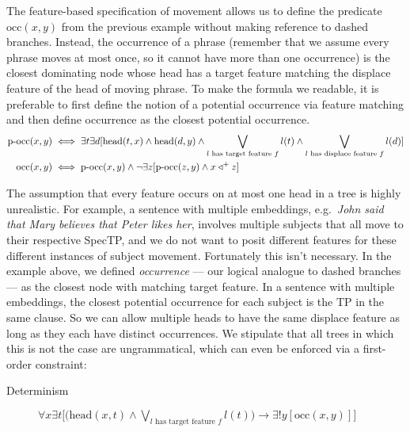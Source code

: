 \begin{examplebox}
    The feature-based specification of movement allows us to define the predicate $\text{occ}(x,y)$ from the previous example without making reference to dashed branches.
    Instead, the occurrence of a phrase (remember that we assume every phrase moves at most once, so it cannot have more than one occurrence) is the closest dominating node whose head has a target feature matching the displace feature of the head of moving phrase.
    To make the formula we readable, it is preferable to first define the notion of a potential occurrence via feature matching and then define occurrence as the closest potential occurrence.
    \begin{align*}
        \text{p-occ}(x,y) & \iff
            \exists t \exists d
                [
                \mathrm{head}(t,x)
                \wedge
                \mathrm{head}(d,y)
                \wedge
                \bigvee_{l \text{ has target feature } f}
                l(t)
                \wedge
                \bigvee_{l \text{ has displace feature } f}
                l(d)
                ]\\
        \text{occ}(x,y) & \iff
            \text{p-occ}(x,y)
            \wedge
            \neg \exists z [
                \text{p-occ}(z,y)
                \wedge
                x \triangleleft^+ z
                ]
    \end{align*}
\end{examplebox}

The assumption that every feature occurs on at most one head in a tree is highly unrealistic.
For example, a sentence with multiple embeddings, e.g.\ \emph{John said that Mary believes that Peter likes her}, involves multiple subjects that all move to their respective SpecTP, and we do not want to posit different features for these different instances of subject movement.
Fortunately this isn't necessary. 
In the example above, we defined \emph{occurrence} --- our logical analogue to dashed branches --- as the closest node with matching target feature.
In a sentence with multiple embeddings, the closest potential occurrence for each subject is the TP in the same clause.
So we can allow multiple heads to have the same displace feature as long as they each have distinct occurrences.
We stipulate that all trees in which this is not the case are ungrammatical, which can even be enforced via a first-order constraint:

\begin{description}
    \item[Determinism]
            \(
                \forall x 
                    \exists t
                        \Big [
                        \big (
                            \mathrm{head}(x,t)
                            \wedge
                            \bigvee_{l \text{ has target feature } f} l(t)
                        \big )
                        \rightarrow
                        \exists! y
                            [\text{occ}(x,y)]
                        \Big ]
            \)
\end{description}

